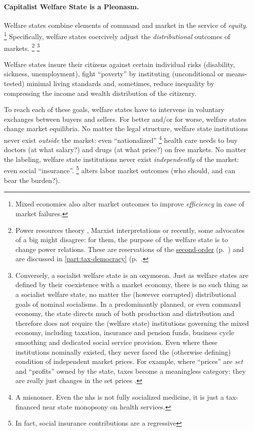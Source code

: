 \paragraph{Capitalist Welfare State is a Pleonasm.}
	\label{sec:interface}
Welfare states combine elements of command and market in the service of \emph{equity}.
\footnote{
	Mixed economies also alter market outcomes to improve \emph{efficiency} in case of market failures.
}
Specifically, welfare states coercively adjust the \emph{distributional} outcomes of markets.
\footnote{
	Power resources theory \citep[for example][]{Korpi2003}, Marxist interpretations \citep[for example][]{Offe1972} or recently, some advocates of a \gls{big} might disagree:
	for them, the purpose of the welfare state is to change power relations.
	These are reservations of the \hyperref[sec:epistemology]{second-order} (p.~\pageref{sec:epistemology}) and are discussed in \autoref{part:tax-democracy} (p.~\pageref{part:tax-democracy}.
}
\footnote{
	Conversely, a socialist welfare state is an oxymoron.
	Just as welfare states are defined by their coexistence with a market economy, there is no such thing as a socialist welfare state, no matter the (however corrupted) distributional goals of nominal socialisms.
	In a predominantly planned, or even command economy, the state directs much of both production and distribution and therefore does not require the (welfare state) institutions governing the mixed economy, including taxation, insurance and pension funds, business cycle smoothing and dedicated social service provision.
	Even where these institutions nominally existed, they never faced the (otherwise defining) condition of independent market prices.
	For example, where ``prices'' are \emph{set} and ``profits'' owned by the state, taxes become a meaningless category:
	they are really just changes in the set prices \citep[for example,][23]{Bonker2006}.
}

Welfare states insure their citizens against certain individual risks (disability, sickness, unemployment), fight ``poverty'' by instituting (unconditional or means-tested) minimal living standards and, sometimes, reduce inequality by compressing the income and wealth distribution of the citizenry.

To reach each of these goals, welfare states have to intervene in voluntary exchanges between buyers and sellers.
For better and/or for worse, welfare states change market equilibria.
No matter the legal structure, welfare state institutions never exist \emph{outside} the market:
even ``nationalized''
\footnote{
	A misnomer.
	Even the \gls{nhs} is not fully socialized medicine, it is just a tax-financed near state monopsony on health services.
}
health care needs to buy doctors (at what salary?) and drugs (at what price?) on free markets.
No matter the labeling, welfare state institutions never exist \emph{independently} of the market:
even social ``insurance''.
\footnote{
	In fact, social insurance contributions are a regressive 
}
alters labor market outcomes (who should, and can bear the burden?).

